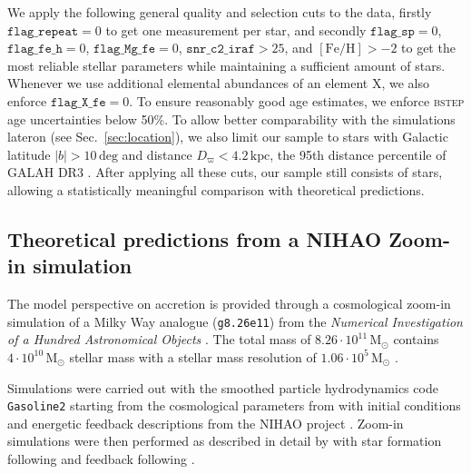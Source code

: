 \documentclass[fleqn,usenatbib]{mnras}
\begin{document}
We apply the following general quality and selection cuts to the data, firstly $\texttt{flag\_repeat} = 0$ to get one measurement per star, and secondly $\texttt{flag\_sp} = 0$, $\texttt{flag\_fe\_h} = 0$, $\texttt{flag\_Mg\_fe} = 0$, $\texttt{snr\_c2\_iraf} > 25$, and $\mathrm{[Fe/H]} > -2$ to get the most reliable stellar parameters while maintaining a sufficient amount of stars. Whenever we use additional elemental abundances of an element X, we also enforce $\texttt{flag\_X\_fe} = 0$. To ensure reasonably good age estimates, we enforce \textsc{bstep} age uncertainties below 50\%. To allow better comparability with the simulations lateron (see Sec.~\ref{sec:location}), we also limit our sample to stars with Galactic latitude $\vert b \vert > 10\,\mathrm{deg}$ and distance $D_\varpi < 4.2\,\mathrm{kpc}$, the 95th distance percentile of GALAH DR3 \citep{Buder2021}. After applying all these cuts, our sample still consists of stars, allowing a statistically meaningful comparison with theoretical predictions.

\subsection{Theoretical predictions from a NIHAO Zoom-in simulation}\label{sec:sim_data}

The model perspective on accretion is provided through a cosmological zoom-in simulation of a Milky Way analogue (\texttt{g8.26e11}) from the \textit{Numerical Investigation of a Hundred Astronomical Objects} \citep[NIHAO,][]{Wang2015}. The total mass of $8.26 \cdot 10^{11}\,\mathrm{M_\odot}$ contains $4 \cdot 10^{10}\,\mathrm{M_\odot}$ stellar mass with a stellar mass resolution of $1.06 \cdot 10^{5}\,\mathrm{M_\odot}$ \citep{Buck2021}.

Simulations were carried out with the smoothed particle hydrodynamics code \texttt{Gasoline2} \citep{Wadsley2017} starting from the cosmological parameters from \citet{Planck2014} with initial conditions and energetic feedback descriptions from the NIHAO project \citep{Wang2015}. Zoom-in simulations were then performed as described in detail by \citet{Buck2021} with star formation following \citet{Stinson2006} and feedback following \citet{Stinson2013}.
\end{document}
